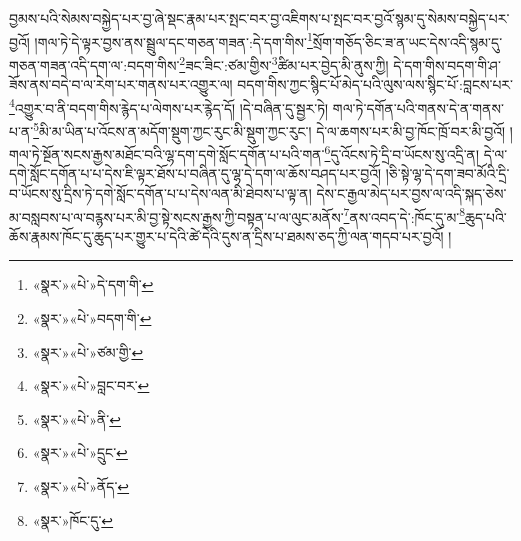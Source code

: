 བྱམས་པའི་སེམས་བསྐྱེད་པར་བྱ་ཞེ་སྡང་རྣམ་པར་སྤང་བར་བྱ་འཇིགས་པ་སྤང་བར་བྱའོ་སྙམ་དུ་སེམས་བསྐྱེད་པར་བྱའོ། །གལ་ཏེ་དེ་ལྟར་བྱས་ནས་སྦྲུལ་དང་གཅན་གཟན་:དེ་དག་གིས་\footnote{«སྣར་»«པེ་»དེ་དག་གི་}སྲོག་གཅོད་ཅིང་ཟ་ན་ཡང་དེས་འདི་སྙམ་དུ་གཅན་གཟན་འདི་དག་ལ་:བདག་གིས་\footnote{«སྣར་»«པེ་»བདག་གི་}ཟང་ཟིང་:ཙམ་གྱིས་\footnote{«སྣར་»«པེ་»ཙམ་གྱི་}ཚིམ་པར་བྱེད་མི་ནུས་ཀྱི། དེ་དག་གིས་བདག་གི་ཤ་ཟོས་ནས་བདེ་བ་ལ་རེག་པར་གནས་པར་འགྱུར་ལ། བདག་གིས་ཀྱང་སྙིང་པོ་མེད་པའི་ལུས་ལས་སྙིང་པོ་:བླངས་པར་\footnote{«སྣར་»«པེ་»བླང་བར་}འགྱུར་བ་ནི་བདག་གིས་རྙེད་པ་ལེགས་པར་རྙེད་དོ། །དེ་བཞིན་དུ་སྦྱར་ཏེ། གལ་ཏེ་དགོན་པའི་གནས་དེ་ན་གནས་པ་ན་\footnote{«སྣར་»«པེ་»ནི་}མི་མ་ཡིན་པ་འོངས་ན་མདོག་སྡུག་ཀྱང་རུང་མི་སྡུག་ཀྱང་རུང་། དེ་ལ་ཆགས་པར་མི་བྱ་ཁོང་ཁྲོ་བར་མི་བྱའོ། །གལ་ཏེ་སྔོན་སངས་རྒྱས་མཐོང་བའི་ལྷ་དག་དགེ་སློང་དགོན་པ་པའི་གན་\footnote{«སྣར་»«པེ་»དྲུང་}དུ་འོངས་ཏེ་དྲི་བ་ཡོངས་སུ་འདྲི་ན། དེ་ལ་དགེ་སློང་དགོན་པ་པ་དེས་ཇི་ལྟར་ཐོས་པ་བཞིན་དུ་ལྷ་དེ་དག་ལ་ཆོས་བཤད་པར་བྱའོ། །ཅི་སྟེ་ལྷ་དེ་དག་ཟབ་མོའི་དྲི་བ་ཡོངས་སུ་དྲིས་ཏེ་དགེ་སློང་དགོན་པ་པ་དེས་ལན་མི་ཐེབས་པ་ལྟ་ན། དེས་ང་རྒྱལ་མེད་པར་བྱས་ལ་འདི་སྐད་ཅེས་མ་བསླབས་པ་ལ་བརྙས་པར་མི་བྱ་སྟེ་སངས་རྒྱས་ཀྱི་བསྟན་པ་ལ་ལུང་མནོས་\footnote{«སྣར་»«པེ་»ནོད་}ནས་འབད་དེ་:ཁོང་དུ་མ་\footnote{«སྣར་»ཁོང་དུ་}ཆུད་པའི་ཆོས་རྣམས་ཁོང་དུ་ཆུད་པར་གྱུར་པ་དེའི་ཚེ་དེའི་དུས་ན་དྲིས་པ་ཐམས་ཅད་ཀྱི་ལན་གདབ་པར་བྱའོ། །
